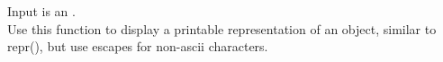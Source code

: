 Input is an .\\

Use this function to display a printable representation of an object, similar to
repr(), but use escapes for non-ascii characters.
